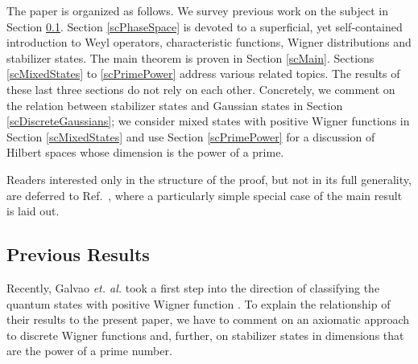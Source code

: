 \documentclass[aps,twocolumn,floatfix]{revtex4}
\begin{document}
The paper is organized as follows. We survey previous work on the
subject in Section \ref{scPrevious}.  Section \ref{scPhaseSpace} is
devoted to a superficial, yet self-contained introduction to 
Weyl operators, characteristic functions, Wigner distributions and
stabilizer states.  The main theorem is proven in Section
\ref{scMain}.  Sections \ref{scMixedStates} to \ref{scPrimePower}
address various related topics. The results of these last three
sections do not rely on each other. Concretely, we comment on the
relation between stabilizer states and Gaussian states in Section
\ref{scDiscreteGaussians}; we consider mixed states with positive
Wigner functions in Section \ref{scMixedStates} and use Section
\ref{scPrimePower} for a discussion of Hilbert spaces whose dimension
is the power of a prime.

Readers interested only in the structure of the proof, but not in
its full generality, are deferred to Ref.\ \cite{prime}, where a
particularly simple special case of the main result is laid out.

\subsection{Previous Results}
\label{scPrevious}

Recently, Galvao \emph{et. al.} took a first step into the direction
of classifying the quantum states with positive Wigner function 
\cite{galvao}. To explain the relationship of their
results to the present paper, we have to comment on 
an axiomatic approach to discrete Wigner functions and, further, on
stabilizer states in dimensions that are the power of a prime number.
\end{document}
